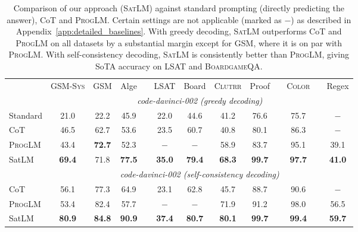 \documentclass{article}
\theoremstyle{definition}
\newcommand{\gsm}{\textsc{GSM}}
\newcommand{\gsmsys}{\textsc{GSM-Sys}}
\newcommand{\lsat}{\textsc{LSAT}}
\newcommand{\clutrr}{\textsc{Clutrr}}
\newcommand{\colorobj}{\textsc{Color}}
\newcommand{\boardgame}{\textsc{BoardgameQA}}
\newcommand{\satlm}{\textsc{SatLM}}
\newcommand{\pallm}{\textsc{ProgLM}}
\begin{document}
\begin{table}[t]
  \caption{Comparison of our approach (\satlm{}) against standard prompting (directly predicting the answer), {\sc CoT} and \pallm{}. Certain settings are not applicable (marked as $-$) as described in Appendix~\ref{app:detailed_baselines}. With greedy decoding, \satlm{} outperforms {\sc CoT} and \pallm{} on all datasets  by a substantial margin except for \gsm{}, where it is on par with \pallm{}. With self-consistency decoding, \satlm{} is consistently better than \pallm{}, giving SoTA accuracy on \lsat{} and \boardgame{}.}
  \vspace{0.5em}
  \label{tab:main}
  \footnotesize
  \renewcommand{\tabcolsep}{1.3mm}
  \centering
  \begin{tabular}{lcccccccccccc}
    \toprule
         & \gsmsys{} & \gsm{} & {\sc Alge} & & \lsat{} & {\sc Board} & \clutrr{} &{\sc Proof} & & \colorobj{} &  & {\sc Regex}\\
        \cmidrule{2-4}\cmidrule{6-9}\cmidrule{11-11}\cmidrule{13-13}
    & \multicolumn{12}{c}{\it \footnotesize code-davinci-002 (greedy decoding)}\vspace{0.05in}\\
    \sc Standard            & 21.0 & 22.2& 45.9 & & 22.0   & 44.6 & 41.2& 76.6  && 75.7&  &    $-$\\
    \sc CoT                 & 46.5 & 62.7& 53.6 && 23.5 & 60.7 & 40.8 &  80.1 && 86.3  & & $-$ \\
    \sc  \pallm{}   & 43.4 & \bf 72.7 & 52.3 && $-$ & $-$  & 58.9 &   83.7 && 95.1 &  & 39.1\\
     \sc SatLM            & \bf 69.4 & 71.8 &\bf 77.5 & & \bf 35.0 & \bf 79.4 & \bf 68.3 & \bf 99.7 && \bf 97.7 & & \bf 41.0\\
        \cmidrule{2-4}\cmidrule{6-9}\cmidrule{11-11}\cmidrule{13-13}
           & \multicolumn{12}{c}{\it \footnotesize  code-davinci-002 (self-consistency decoding)}\vspace{0.05in}\\
    \sc CoT                 & 56.1  & 77.3& 64.9 && 23.1  & 62.8 & 45.7 & 88.7 & & 90.6 & &  $-$\\
    \sc  \pallm{}   & 53.4& 82.4 & 57.7 & & $-$ & $-$ & 71.9 &  91.2 && 98.0  & & 56.5   \\
    \sc  SatLM   & \bf 80.9 & \bf 84.8 & \bf 90.9& & \bf 37.4 & \bf 80.7 & \bf 80.1&  \bf 99.7 && \bf 99.4  && \bf 59.7 \\
    \bottomrule
  \end{tabular}
\end{table}
\end{document}

